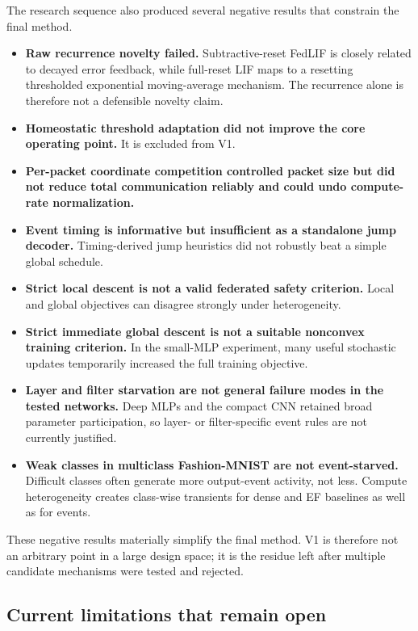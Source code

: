The research sequence also produced several negative results that constrain the final method.
\begin{itemize}
    \item \textbf{Raw recurrence novelty failed.} Subtractive-reset FedLIF is closely related to decayed error feedback, while full-reset LIF maps to a resetting thresholded exponential moving-average mechanism. The recurrence alone is therefore not a defensible novelty claim.
    \item \textbf{Homeostatic threshold adaptation did not improve the core operating point.} It is excluded from V1.
    \item \textbf{Per-packet coordinate competition controlled packet size but did not reduce total communication reliably and could undo compute-rate normalization.}
    \item \textbf{Event timing is informative but insufficient as a standalone jump decoder.} Timing-derived jump heuristics did not robustly beat a simple global schedule.
    \item \textbf{Strict local descent is not a valid federated safety criterion.} Local and global objectives can disagree strongly under heterogeneity.
    \item \textbf{Strict immediate global descent is not a suitable nonconvex training criterion.} In the small-MLP experiment, many useful stochastic updates temporarily increased the full training objective.
    \item \textbf{Layer and filter starvation are not general failure modes in the tested networks.} Deep MLPs and the compact CNN retained broad parameter participation, so layer- or filter-specific event rules are not currently justified.
    \item \textbf{Weak classes in multiclass Fashion-MNIST are not event-starved.} Difficult classes often generate more output-event activity, not less. Compute heterogeneity creates class-wise transients for dense and EF baselines as well as for events.
\end{itemize}

These negative results materially simplify the final method. V1 is therefore not an arbitrary point in a large design space; it is the residue left after multiple candidate mechanisms were tested and rejected.

\subsection{Current limitations that remain open}

